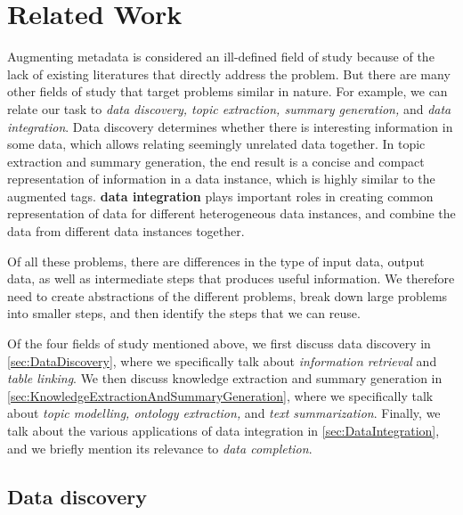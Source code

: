 
\chapter{Related Work}
\label{ch:RelatedWork}

Augmenting metadata is considered an ill-defined field of study because of the lack of existing literatures that directly address the problem. But there are many other fields of study that target problems similar in nature. For example, we can relate our task to \textit{data discovery, topic extraction, summary generation,} and \textit{data integration}. Data discovery determines whether there is interesting information in some data, which allows relating seemingly unrelated data together. In topic extraction and summary generation, the end result is a concise and compact representation of information in a data instance, which is highly similar to the augmented tags. \textbf{\Gls{data integration}} plays important roles in creating common representation of data for different heterogeneous data instances, and combine the data from different data instances together.

Of all these problems, there are differences in the type of input data, output data, as well as intermediate steps that produces useful information. We therefore need to create abstractions of the different problems, break down large problems into smaller steps, and then identify the steps that we can reuse.

Of the four fields of study mentioned above, we first discuss data discovery in \autoref{sec:DataDiscovery}, where we specifically talk about \textit{information retrieval} and \textit{table linking}. We then discuss knowledge extraction and summary generation in \autoref{sec:KnowledgeExtractionAndSummaryGeneration}, where we specifically talk about \textit{topic modelling, ontology extraction,} and \textit{text summarization}. Finally, we talk about the various applications of data integration in \autoref{sec:DataIntegration}, and we briefly mention its relevance to \textit{data completion}.

\section{Data discovery}
\label{sec:DataDiscovery}

